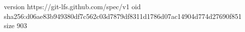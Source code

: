 version https://git-lfs.github.com/spec/v1
oid sha256:d06ae83b949380df7c562c03d7879df8311d1786d07ac14904d774d27690f851
size 903
